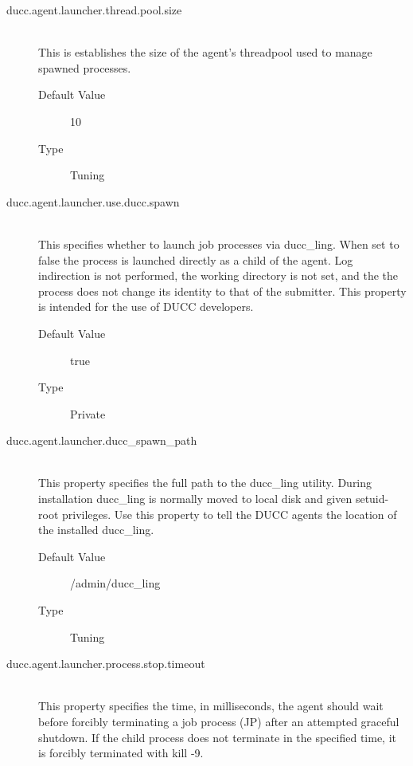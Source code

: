 \begin{description}
        \item[ducc.agent.launcher.thread.pool.size] \hfill \\
          This is establishes the size of the agent's threadpool used to manage spawned processes. 
          \begin{description}
            \item[Default Value] 10 
            \item[Type] Tuning 
          \end{description}
          
        \item[ducc.agent.launcher.use.ducc.spawn] \hfill \\
          This specifies whether to launch job processes via ducc\_ling. When set to false the process 
          is launched directly as a child of the agent. Log indirection is not performed, the working 
          directory is not set, and the the process does not change its identity to that of the submitter. 
          This property is intended for the use of DUCC developers. 
          \begin{description}
            \item[Default Value] true 
            \item[Type] Private 
          \end{description}
          
        \item[ducc.agent.launcher.ducc\_spawn\_path] \hfill \\
          This property specifies the full path to the ducc\_ling utility. During installation ducc\_ling 
          is normally moved to local disk and given setuid-root privileges. Use this property to tell 
          the DUCC agents the location of the installed ducc\_ling. 
          \begin{description}
            \item[Default Value] \ducchome/admin/ducc\_ling 
            \item[Type] Tuning             
          \end{description}
          
        \item[ducc.agent.launcher.process.stop.timeout] \hfill \\
          This property specifies the time, in milliseconds, the agent should wait before forcibly 
          terminating a job process (JP) after an attempted graceful shutdown. If the child process 
          does not terminate in the specified time, it is forcibly terminated with kill -9. 


\end{description}
